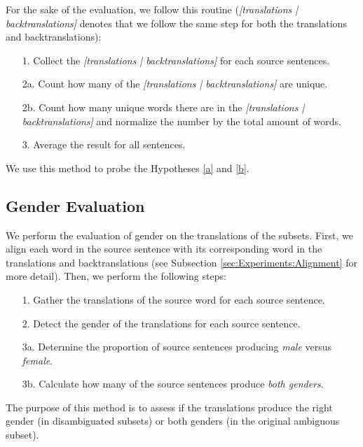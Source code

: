 For the sake of the evaluation, we follow this routine (\textit{[translations | backtranslations]} denotes that we follow the same step for both the translations and backtranslations):
\begin{enumerate}
    \item[1. ] Collect the \textit{[translations | backtranslations]} for each source sentences.
    \item[2a. ] Count how many of the \textit{[translations | backtranslations]} are unique. 
    \item[2b. ] Count how many unique words there are in the \textit{[translations | backtranslations]} and normalize the number by the total amount of words. 
    \item[3. ] Average the result for all sentences.
\end{enumerate}

We use this method to probe the Hypotheses \ref{a} and \ref{b}. 

\subsection{Gender Evaluation}
\label{sec:Experiments:Statistics:Gender}
We perform the evaluation of gender on the translations of the subsets.  First, we align each word in the source sentence with its corresponding word in the translations and backtranslations (see Subsection \ref{sec:Experiments:Alignment} for more detail). Then, we perform the following steps:

\begin{enumerate}
    \item[1. ] Gather the translations of the source word for each source sentence.
    \item[2. ] Detect the gender of the translations for each source sentence.
    \item[3a. ] Determine the proportion of source sentences producing \textit{male} versus \textit{female}.
    \item[3b. ] Calculate how many of the source sentences produce \textit{both genders}. 
\end{enumerate}

The purpose of this method is to assess if the translations produce the right gender (in disambiguated subsets) or both genders (in the original ambiguous subset).

